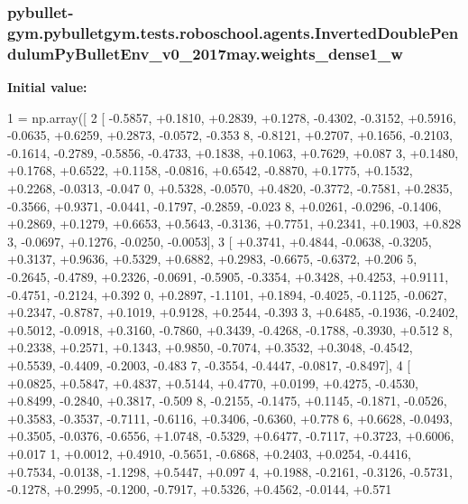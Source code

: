 \subsubsection[{\texorpdfstring{weights\+\_\+dense1\+\_\+w}{weights_dense1_w}}]{\setlength{\rightskip}{0pt plus 5cm}pybullet-\/gym.\+pybulletgym.\+tests.\+roboschool.\+agents.\+Inverted\+Double\+Pendulum\+Py\+Bullet\+Env\+\_\+v0\+\_\+2017may.\+weights\+\_\+dense1\+\_\+w}\hypertarget{namespacepybullet-gym_1_1pybulletgym_1_1tests_1_1roboschool_1_1agents_1_1_inverted_double_pendulum_py_bullet_env__v0__2017may_a6c79d78cab0ba602a8e9cbc786131074}{}\label{namespacepybullet-gym_1_1pybulletgym_1_1tests_1_1roboschool_1_1agents_1_1_inverted_double_pendulum_py_bullet_env__v0__2017may_a6c79d78cab0ba602a8e9cbc786131074}
{\bfseries Initial value\+:}
\begin{DoxyCode}
1 = np.array([
2 [ -0.5857, +0.1810, +0.2839, +0.1278, -0.4302, -0.3152, +0.5916, -0.0635, +0.6259, +0.2873, -0.0572, -0.353
      8, -0.8121, +0.2707, +0.1656, -0.2103, -0.1614, -0.2789, -0.5856, -0.4733, +0.1838, +0.1063, +0.7629, +0.087
      3, +0.1480, +0.1768, +0.6522, +0.1158, -0.0816, +0.6542, -0.8870, +0.1775, +0.1532, +0.2268, -0.0313, -0.047
      0, +0.5328, -0.0570, +0.4820, -0.3772, -0.7581, +0.2835, -0.3566, +0.9371, -0.0441, -0.1797, -0.2859, -0.023
      8, +0.0261, -0.0296, -0.1406, +0.2869, +0.1279, +0.6653, +0.5643, -0.3136, +0.7751, +0.2341, +0.1903, +0.828
      3, -0.0697, +0.1276, -0.0250, -0.0053],
3 [ +0.3741, +0.4844, -0.0638, -0.3205, +0.3137, +0.9636, +0.5329, +0.6882, +0.2983, -0.6675, -0.6372, +0.206
      5, -0.2645, -0.4789, +0.2326, -0.0691, -0.5905, -0.3354, +0.3428, +0.4253, +0.9111, -0.4751, -0.2124, +0.392
      0, +0.2897, -1.1101, +0.1894, -0.4025, -0.1125, -0.0627, +0.2347, -0.8787, +0.1019, +0.9128, +0.2544, -0.393
      3, +0.6485, -0.1936, -0.2402, +0.5012, -0.0918, +0.3160, -0.7860, +0.3439, -0.4268, -0.1788, -0.3930, +0.512
      8, +0.2338, +0.2571, +0.1343, +0.9850, -0.7074, +0.3532, +0.3048, -0.4542, +0.5539, -0.4409, -0.2003, -0.483
      7, -0.3554, -0.4447, -0.0817, -0.8497],
4 [ +0.0825, +0.5847, +0.4837, +0.5144, +0.4770, +0.0199, +0.4275, -0.4530, +0.8499, -0.2840, +0.3817, -0.509
      8, -0.2155, -0.1475, +0.1145, -0.1871, -0.0526, +0.3583, -0.3537, -0.7111, -0.6116, +0.3406, -0.6360, +0.778
      6, +0.6628, -0.0493, +0.3505, -0.0376, -0.6556, +1.0748, -0.5329, +0.6477, -0.7117, +0.3723, +0.6006, +0.017
      1, +0.0012, +0.4910, -0.5651, -0.6868, +0.2403, +0.0254, -0.4416, +0.7534, -0.0138, -1.1298, +0.5447, +0.097
      4, +0.1988, -0.2161, -0.3126, -0.5731, -0.1278, +0.2995, -0.1200, -0.7917, +0.5326, +0.4562, -0.0144, +0.571

\end{DoxyCode}
